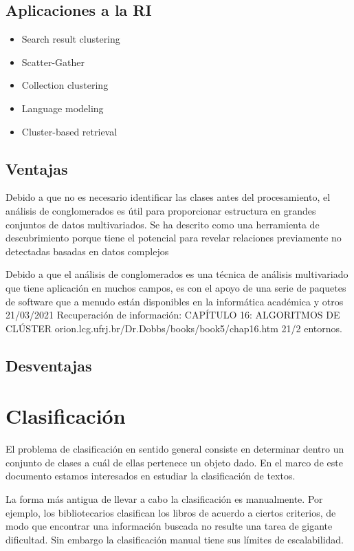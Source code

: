 \documentclass{llncs}
\begin{document}
\subsection{Aplicaciones a la RI} 
\begin{itemize}
	\item Search result clustering
	
	\item Scatter-Gather
	
	\item Collection clustering
	
	\item Language modeling
	
	\item Cluster-based retrieval
\end{itemize}

\subsection{Ventajas} 

Debido a que no es necesario identificar las clases antes del procesamiento, el análisis de conglomerados es útil para proporcionar
estructura en grandes conjuntos de datos multivariados. Se ha descrito como una herramienta de descubrimiento porque tiene el potencial
para revelar relaciones previamente no detectadas basadas en datos complejos

Debido a que el análisis de conglomerados es una técnica de análisis multivariado que tiene aplicación en muchos campos, es
con el apoyo de una serie de paquetes de software que a menudo están disponibles en la informática académica y otros
21/03/2021
Recuperación de información: CAPÍTULO 16: ALGORITMOS DE CLÚSTER
orion.lcg.ufrj.br/Dr.Dobbs/books/book5/chap16.htm
21/2
entornos.
\subsection{Desventajas} 

\section{Clasificaci\'on}

	El problema de clasificaci\'on en sentido general consiste en determinar dentro un conjunto de clases a cu\'al de ellas pertenece un objeto dado. En el marco de este documento estamos interesados en estudiar la clasificaci\'on de textos. 
	
%	
	La forma m\'as antigua de llevar a cabo la clasificaci\'on es manualmente. Por ejemplo, los bibliotecarios clasifican los libros de acuerdo a ciertos criterios, de modo que encontrar una informaci\'on buscada no resulte una tarea de gigante dificultad. Sin embargo la clasificaci\'on manual tiene sus l\'imites de escalabilidad. 
	
\end{document}
